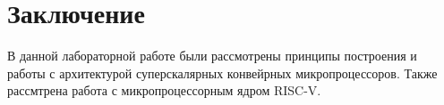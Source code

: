 \chapter*{Заключение}

В данной лабораторной работе были рассмотрены принципы построения и работы с архитектурой суперскалярных конвейрных микропроцессоров. Также рассмтрена работа с микропроцессорным ядром RISC-V.
